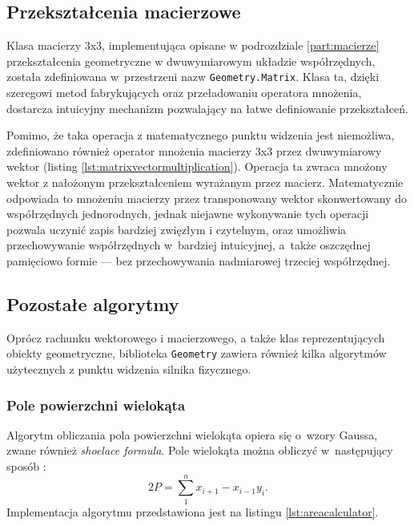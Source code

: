 

\subsection{Przekształcenia macierzowe}
Klasa macierzy 3x3, implementująca opisane w podrozdziale \ref{part:macierze} przekształcenia geometryczne w dwuwymiarowym układzie współrzędnych, została zdefiniowana w~przestrzeni nazw \verb|Geometry.Matrix|. Klasa ta, dzięki szeregowi metod fabrykujących oraz przeładowaniu \mbox{operatora} mnożenia, dostarcza intuicyjny mechanizm pozwalający na łatwe definiowanie przekształceń. 

Pomimo, że taka operacja z matematycznego punktu widzenia jest niemożliwa, zdefiniowano również operator mnożenia macierzy 3x3 przez dwuwymiarowy wektor (listing \ref{lst:matrixvectormultiplication}). Operacja ta zwraca mnożony wektor z nałożonym przekształceniem wyrażanym przez macierz. Matematycznie odpowiada to mnożeniu macierzy przez transponowany wektor skonwertowany do współrzędnych jednorodnych, jednak niejawne wykonywanie tych operacji pozwala uczynić zapis bardziej zwięzłym i czytelnym, oraz umożliwia przechowywanie współrzędnych w~bardziej intuicyjnej, a~także oszczędnej pamięciowo formie --- bez przechowywania nadmiarowej trzeciej współrzędnej.



\subsection{Pozostałe algorytmy}
Oprócz rachunku wektorowego i macierzowego, a także klas reprezentujących obiekty geometryczne, biblioteka \verb|Geometry| zawiera również kilka algorytmów użytecznych z punktu widzenia silnika fizycznego.

\subsubsection{Pole powierzchni wielokąta}
Algorytm obliczania pola powierzchni wielokąta opiera się o~wzory Gaussa, zwane również \textit{shoelace formula}. Pole wielokąta można obliczyć w~następujący sposób \cite{bib:geodezja1}:
\begin{equation}
2P = \sum_{1}^{n}{x_{i+1}-x_{i-1}y_i}.
\end{equation}
Implementacja algorytmu przedstawiona jest na listingu \ref{lst:areacalculator}.


